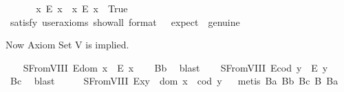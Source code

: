 \begin{isabellebody}
\isadelimproof
\ %
\endisadelimproof
%
\isatagproof
{}\isamarkupfalse%
%
\endisatagproof
{\isafoldproof}%
%
\isadelimproof
%
\endisadelimproof
\isanewline
\ \ \isamarkupfalse%
\ \ {\isachardoublequoteopen}{\isacharparenleft}{\isasymexists}x{\isachardot}\ \isactrlbold {\isasymnot}{\isacharparenleft}E\ x{\isacharparenright}{\isacharparenright}\ {\isasymand}\ {\isacharparenleft}{\isasymexists}x{\isachardot}\ {\isacharparenleft}E\ x{\isacharparenright}{\isacharparenright}{\isachardoublequoteclose}\ \ True\ \ %
\ \isanewline
\ \ \ \ \isamarkupfalse%
\ {\isacharbrackleft}satisfy{\isacharcomma}\ user{\isacharunderscore}axioms{\isacharcomma}\ show{\isacharunderscore}all{\isacharcomma}\ format\ {\isacharequal}\ {}{\isacharcomma}\ expect\ {\isacharequal}\ genuine{\isacharbrackright}%
\isadelimproof
\ %
\endisadelimproof
%
\isatagproof
{}\isamarkupfalse%
%
\endisatagproof
{\isafoldproof}%
%
\isadelimproof
%
\endisadelimproof
%
\begin{isamarkuptext}%
Now Axiom Set V is implied.%
\end{isamarkuptext}\isamarkuptrue%
\ \ \isamarkupfalse%
\ S{}FromVIII{\isacharcolon}\ {\isachardoublequoteopen}E{\isacharparenleft}dom\ x{\isacharparenright}\ \isactrlbold {\isasymrightarrow}\ E\ x{\isachardoublequoteclose}%
\isadelimproof
\ \ %
\endisadelimproof
%
\isatagproof
{}\isamarkupfalse%
\ B{}b\ \isamarkupfalse%
\ blast%
\endisatagproof
{\isafoldproof}%
%
\isadelimproof
%
\endisadelimproof
\isanewline
\ \ \isamarkupfalse%
\ S{}FromVIII{\isacharcolon}\ {\isachardoublequoteopen}E{\isacharparenleft}cod\ y{\isacharparenright}\ \isactrlbold {\isasymrightarrow}\ E\ y{\isachardoublequoteclose}%
\isadelimproof
\ \ %
\endisadelimproof
%
\isatagproof
{}\isamarkupfalse%
\ B{}c\ \isamarkupfalse%
\ blast%
\endisatagproof
{\isafoldproof}%
%
\isadelimproof
%
\endisadelimproof
\ \isanewline
\ \ \isamarkupfalse%
\ S{}FromVIII{\isacharcolon}\ {\isachardoublequoteopen}E{\isacharparenleft}x{\isasymcdot}y{\isacharparenright}\ \isactrlbold {\isasymleftrightarrow}\ dom\ x\ {\isasymsimeq}\ cod\ y{\isachardoublequoteclose}%
\isadelimproof
\ %
\endisadelimproof
%
\isatagproof
{}\isamarkupfalse%
\ {\isacharparenleft}metis\ B{}a\ B{}b\ B{}c\ B{}\ B{}a{\isacharparenright}%

\end{isabellebody}
